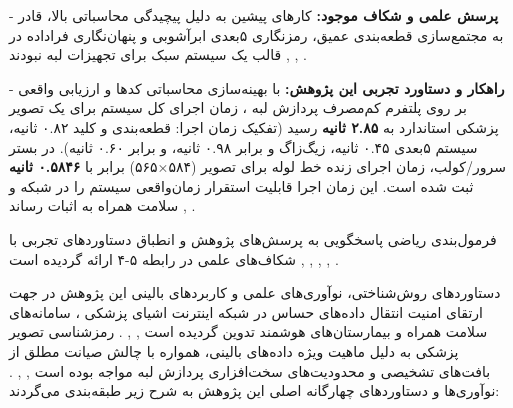 {-} \textbf{پرسش علمی و شکاف موجود:} کارهای پیشین به دلیل پیچیدگی محاسباتی بالا، قادر به مجتمع‌سازی قطعه‌بندی عمیق، رمزنگاری ۵بعدی ابرآشوبی و پنهان‌نگاری فراداده در قالب یک سیستم سبک برای تجهیزات لبه  نبودند , , .\par

{-} \textbf{راهکار و دستاورد تجربی این پژوهش:} با بهینه‌سازی محاسباتی کدها و ارزیابی واقعی بر روی پلتفرم کم‌مصرف پردازش لبه ، زمان اجرای کل سیستم برای یک تصویر پزشکی استاندارد به \textbf{۲.۸۵ ثانیه} رسید (تفکیک زمان اجرا: قطعه‌بندی  و کلید ۰.۸۲ ثانیه، سیستم ۵بعدی ۰.۴۵ ثانیه، زیگ‌زاگ و  برابر ۰.۹۸ ثانیه، و  برابر ۰.۶۰ ثانیه). در بستر سرور/کولب، زمان اجرای زنده خط لوله برای تصویر  (۵۸۴×۵۶۵) برابر با \textbf{۰.۵۸۴۶ ثانیه} ثبت شده است. این زمان اجرا قابلیت استقرار زمان‌واقعی سیستم را در شبکه  و سلامت همراه به اثبات رساند , .\par



فرمول‌بندی ریاضی پاسخگویی به پرسش‌های پژوهش و انطباق دستاوردهای تجربی با شکاف‌های علمی در رابطه ۵{-}۴ ارائه گردیده است , , , , .\par






دستاوردهای روش‌شناختی، نوآوری‌های علمی و کاربردهای بالینی این پژوهش در جهت ارتقای امنیت انتقال داده‌های حساس در شبکه اینترنت اشیای پزشکی ، سامانه‌های سلامت همراه  و بیمارستان‌های هوشمند تدوین گردیده است , , . رمزشناسی تصویر پزشکی به دلیل ماهیت ویژه داده‌های بالینی، همواره با چالش صیانت مطلق از بافت‌های تشخیصی و محدودیت‌های سخت‌افزاری پردازش لبه مواجه بوده است , , . نوآوری‌ها و دستاوردهای چهارگانه اصلی این پژوهش به شرح زیر طبقه‌بندی می‌گردند:\par

